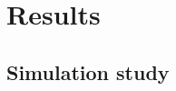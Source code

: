 \documentclass[]{rsos}%
\begin{document}

\section{Results}\label{s:results}

\subsection{Simulation study}
\end{document}
